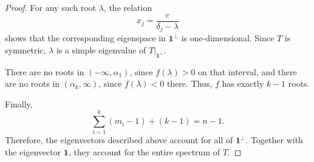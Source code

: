 \documentclass[10pt,a4paper]{amsart}
\begin{document}
\begin{proof}
For any such root $\lambda$, the relation
\[
x_j=\frac{c}{\delta_j-\lambda}
\]
shows that the corresponding eigenspace in $\mathbf{1}^{\perp}$ is
one-dimensional. Since $T$ is symmetric, $\lambda$ is a simple
eigenvalue of $\left.T\right|_{\mathbf{1}^{\perp}}$.

There are no roots in $(-\infty,\alpha_1)$, since $f(\lambda)>0$ on
that interval, and there are no roots in $(\alpha_k,\infty)$, since
$f(\lambda)<0$ there. Thus, $f$ has exactly $k-1$ roots.

Finally,
\[
\sum_{i=1}^{k}(m_i-1)+(k-1)=n-1.
\]
Therefore, the eigenvectors described above account for all of
$\mathbf{1}^{\perp}$. Together with the eigenvector $\mathbf{1}$,
they account for the entire spectrum of $T$.
\end{proof}
\end{document}
